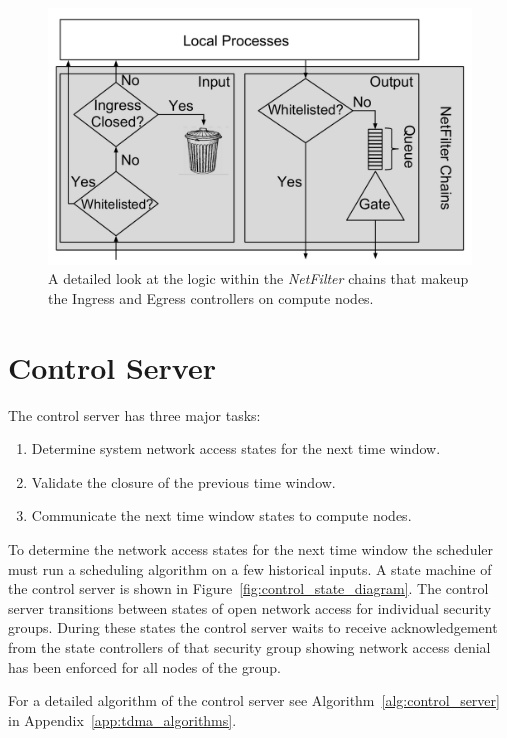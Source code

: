 \documentclass[oneside,12pt]{memoir}
\begin{document}
\begin{figure}
\centering
\includegraphics[scale=0.57]{netfilter_in_out_chains.pdf}
\caption{A detailed look at the logic within the \textit{NetFilter} chains that makeup the Ingress and Egress controllers on compute nodes.}
\label{fig:netfilter_in_out_chains}
\end{figure}

\section{Control Server}
The control server has three major tasks: 
\begin{enumerate}
\item Determine system network access states for the next time window.
\item Validate the closure of the previous time window.
\item Communicate the next time window states to compute nodes.
\end{enumerate}

To determine the network access states for the next time window the scheduler must run a scheduling algorithm on a few historical inputs. A state machine of the control server is shown in Figure~\ref{fig:control_state_diagram}. The control server transitions between states of open network access for individual security groups. During these states the control server waits to receive acknowledgement from the state controllers of that security group showing network access denial has been enforced for all nodes of the group. 

For a detailed algorithm of the control server see Algorithm~\ref{alg:control_server} in Appendix~\ref{app:tdma_algorithms}.
\end{document}
